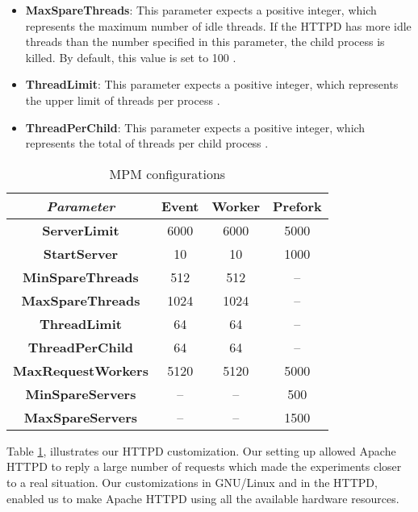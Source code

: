\begin{itemize}
  \item \textbf{MaxSpareThreads}: This parameter expects a positive integer,
        which represents the maximum number of idle threads. If the HTTPD has
        more idle threads than the number specified in this parameter, the
        child process is killed. By default, this value is set to 100
        \cite{mpm_maxsparethreads}.
  \item \textbf{ThreadLimit}: This parameter expects a positive integer, which
        represents the upper limit of threads per process
        \cite{mpm_threadlimits}.
  \item \textbf{ThreadPerChild}: This parameter expects a positive integer,
        which represents the total of threads per child process
        \cite{mpm_threadperchild}.
\end{itemize}

\begin{table}
  \centering
  \begin{tabular}{|c|c|c|c|}
    \hline
    \textit{Parameter} & \textbf{Event} & \textbf{Worker} & \textbf{Prefork} \\
    \hline
    \textbf{ServerLimit} & 6000 & 6000 & 5000\\
    \hline
    \textbf{StartServer} & 10 & 10 & 1000\\
    \hline
    \textbf{MinSpareThreads} & 512 & 512 & --\\
    \hline
    \textbf{MaxSpareThreads} & 1024 & 1024 & --\\
    \hline
    \textbf{ThreadLimit} & 64 & 64 & --\\
    \hline
    \textbf{ThreadPerChild} & 64 & 64 & --\\
    \hline
    \textbf{MaxRequestWorkers} & 5120 & 5120 & 5000\\
    \hline
    \textbf{MinSpareServers} & -- & -- & 500\\
    \hline
    \textbf{MaxSpareServers} & -- & -- & 1500\\
    \hline
  \end{tabular}
  \caption{MPM configurations}
  \label{tab:configuration}
\end{table}

Table \ref{tab:configuration}, illustrates our HTTPD customization. Our setting up allowed Apache
HTTPD to reply a large number of requests which made the experiments closer to
a real situation. Our customizations in GNU/Linux and in the HTTPD, enabled us
to make Apache HTTPD using all the available hardware resources.

